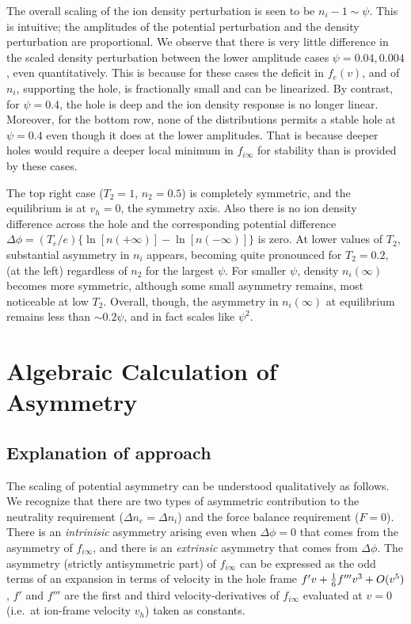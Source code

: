 \documentclass[12pt]{article}
\begin{document}
The overall scaling of the ion density perturbation is seen to be
$n_i-1\sim \psi$. This is intuitive; the amplitudes of the potential
perturbation and the density perturbation are proportional.  We
observe that there is very little difference in the scaled density
perturbation between the lower amplitude cases $\psi=0.04,0.004$, even
quantitatively. This is because for these cases the deficit in
$f_e(v)$, and of $n_i$, supporting the hole, is fractionally small and
can be linearized. By contrast, for $\psi=0.4$, the hole is deep and the
ion density response is no longer linear. Moreover, for the bottom
row, none of the distributions permits a stable hole at $\psi=0.4$
even though it does at the lower amplitudes. That is because deeper
holes would require a deeper local minimum in $f_{i\infty}$ for
stability than is provided by these cases.

The top right case ($T_{2}=1$, $n_2=0.5$) is completely symmetric, and
the equilibrium is at $v_h=0$, the symmetry axis. Also there is no ion
density difference across the hole and the corresponding potential
difference $\Delta\phi=(T_e/e)\{\ln[n(+\infty)]-\ln[n(-\infty)]\}$ is
zero. At lower values of $T_2$, substantial asymmetry in $n_i$
appears, becoming quite pronounced for $T_2=0.2$, (at the left)
regardless of $n_2$ for the largest $\psi$. For smaller $\psi$,
density $n_i(\infty)$ becomes more symmetric, although some small
asymmetry remains, most noticeable at low $T_2$. Overall, though, the
asymmetry in $n_i(\infty)$ at equilibrium remains less than
$\sim 0.2\psi$, and in fact scales like $\psi^2$.

\section{Algebraic Calculation of Asymmetry}

\subsection{Explanation of approach}
The scaling of potential asymmetry can be understood qualitatively as
follows. We recognize that there are two types of asymmetric
contribution to the neutrality requirement ($\Delta n_e=\Delta n_i$)
and the force balance requirement ($F=0$). There is an
\emph{intrinisic} asymmetry arising even when $\Delta\phi=0$ that
comes from the asymmetry of $f_{i\infty}$, and there is an
\emph{extrinsic} asymmetry that comes from $\Delta \phi$.  The
asymmetry (strictly antisymmetric part) of $f_{i\infty}$ can be
expressed as the odd terms of an expansion in terms of velocity in the
hole frame $f'v+{1\over6}f'''v^3+O(v^5)$, $f'$ and $f'''$ are the
first and third velocity-derivatives of $f_{i\infty}$ evaluated at
$v=0$ (i.e.\ at ion-frame velocity $v_h$) taken as constants.
\end{document}
